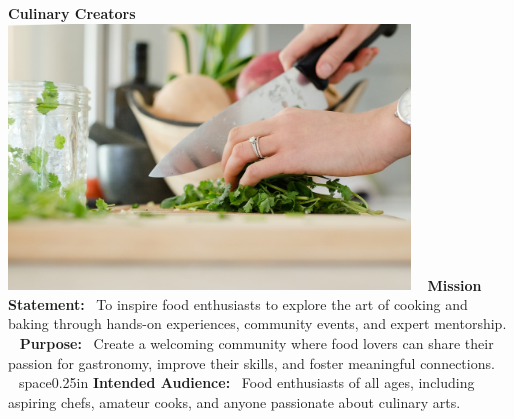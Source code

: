 \documentclass[12pt]{article}
\begin{document}
        \begin{center}
        \textbf{\Huge Culinary Creators} \
        \vspace{0.5in}
        \includegraphics[width=0.8\textwidth]{images/cooking.jpg} \
        \vspace{0.5in}
        \textbf{\Large Mission Statement:} \
        To inspire food enthusiasts to explore the art of cooking and baking through hands-on experiences, community events, and expert mentorship. \
        \vspace{0.25in}
        \textbf{\Large Purpose:} \
        Create a welcoming community where food lovers can share their passion for gastronomy, improve their skills, and foster meaningful connections. \
        space{0.25in}
        \textbf{\Large Intended Audience:} \
        Food enthusiasts of all ages, including aspiring chefs, amateur cooks, and anyone passionate about culinary arts.
        \end{center}
        
\end{document}
